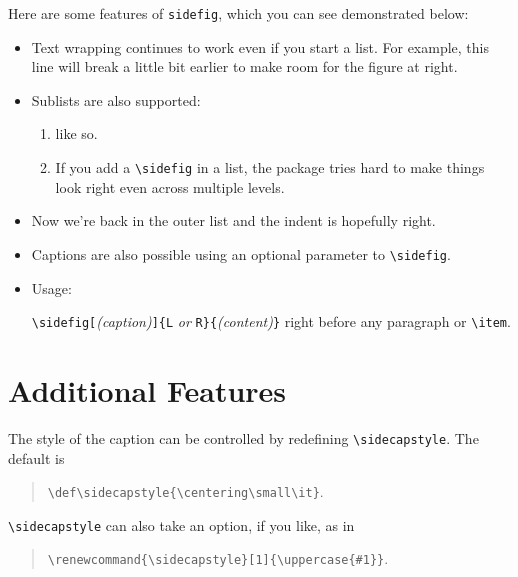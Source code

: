 \documentclass{article}
\begin{document}
	Here are some features of \texttt{sidefig}, which you can see demonstrated below:
	\begin{itemize}

		\item Text wrapping continues to work even if you start a list.
		For example, this line will break a little bit earlier to make room for the figure at right.
		
		\item Sublists are also supported:
		

		\begin{enumerate}
			
			\item like so.

			
			\item If you add a \verb|\sidefig| in a list, the package tries hard to make things look right even across multiple levels.
		\end{enumerate}
		
		\item Now we're back in the outer list and the indent is hopefully right.
			
		\item Captions are also possible using an optional parameter to \verb|\sidefig|.
		
		\item Usage:
		
		\verb|\sidefig[|\emph{(caption)}\verb|]{L|\emph{ or }\verb|R}{|\emph{(content)}\verb|}| right before any paragraph or \verb|\item|.
	\end{itemize}
	
	\pagebreak %
	
	\renewcommand{\sidecapstyle}[1]{\uppercase{#1}}
	
	\section*{Additional Features}

	The style of the caption can be controlled by redefining \verb|\sidecapstyle|.
	The default is
	\begin{quote}
		\verb|\def\sidecapstyle{\centering\small\it}|.
	\end{quote}
	\verb|\sidecapstyle| can also take an option, if you like, as in
	\begin{quote}
		\verb|\renewcommand{\sidecapstyle}[1]{\uppercase{#1}}|.
	\end{quote}
	
\end{document}
